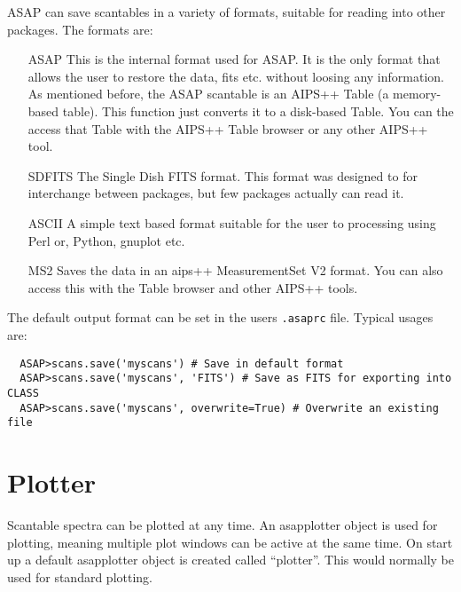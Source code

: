 \documentclass[11pt]{article}
\begin{document}
ASAP can save scantables in a
variety of formats, suitable for reading into other packages. The
formats are:

\begin{itemize}
\item[ASAP] This is the internal format used for ASAP. It is the only
  format that allows the user to restore the data, fits etc. without
  loosing any information.  As mentioned before, the ASAP scantable is
  an AIPS++ Table (a memory-based table).  This function just converts
  it to a disk-based Table.  You can the access that Table with the
  AIPS++ Table browser or any other AIPS++ tool.

\item[SDFITS] The Single Dish FITS format. This format was designed to
  for interchange between packages, but few packages actually can read
  it.


\item[ASCII] A simple text based format suitable for the user to
processing using Perl or, Python, gnuplot etc.

\item[MS2] Saves the data in an aips++ MeasurementSet V2 format.
You can also access this with the Table browser and other AIPS++
tools.

\end{itemize}

The default output format can be set in the users {\tt .asaprc} file.
Typical usages are:

\begin{verbatim}
  ASAP>scans.save('myscans') # Save in default format
  ASAP>scans.save('myscans', 'FITS') # Save as FITS for exporting into CLASS
  ASAP>scans.save('myscans', overwrite=True) # Overwrite an existing file
\end{verbatim}

\section{Plotter}

Scantable spectra can be plotted at any time. An
asapplotter object is used for plotting, meaning multiple plot windows
can be active at the same time. On start up a default asapplotter
object is created called ``plotter''. This would normally be used for
standard plotting.
\end{document}
